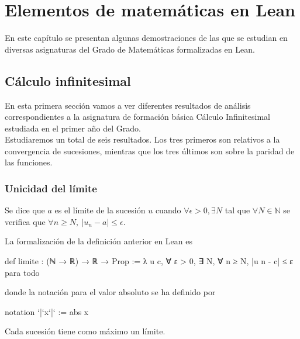 \chapter{Elementos de matemáticas en Lean}

En este capítulo se presentan algunas demostraciones de las que se
estudian en diversas asignaturas del Grado de Matemáticas formalizadas en Lean.

\section{Cálculo infinitesimal}
En esta primera sección vamos a ver diferentes resultados de análisis correspondientes a la asignatura de formación básica Cálculo Infinitesimal estudiada en el primer año del Grado.\\

Estudiaremos un total de seis resultados. Los tres primeros son relativos a la convergencia de sucesiones, mientras que los tres últimos son sobre la paridad de las funciones.

\subsection{Unicidad del límite}

\begin{definicion}\label{limite}
  Se dice que \(a\) es el límite de la sucesión \(u\) cuando \( \forall \epsilon >0, \exists N\) tal que \( \forall N \in \mathbb{N}\) se verifica que \(\forall n \geq N, \ |u_n-a| \leq \epsilon\).
\end{definicion}

La formalización de la definición anterior en Lean es
\begin{leancode}
def limite : (ℕ → ℝ) → ℝ → Prop :=
λ u c, ∀ ε > 0, ∃ N, ∀ n ≥ N, |u n - c| ≤ ε para todo
\end{leancode}
donde la notación para el valor absoluto se ha definido por
\begin{leancode}
notation `|`x`|` := abs x
\end{leancode}

\begin{teorema}
Cada sucesión tiene como máximo un límite.
\end{teorema}

